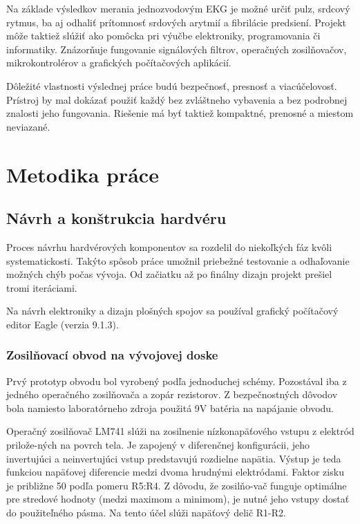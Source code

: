\documentclass[titlepage,12pt]{article}
\begin{document}
Na základe výsledkov merania jednozvodovým EKG je možné určiť pulz, srdcový rytmus, ba aj odhaliť prítomnosť srdových arytmií a fibrilácie predsiení. Projekt môže taktiež slúžiť ako pomôcka pri výučbe elektroniky, programovania či informatiky. Znázorňuje fungovanie signálových filtrov, operačných zosilňovačov, mikrokontrolérov a grafických počítačových aplikácií.

Dôležité vlastnosti výslednej práce budú bezpečnosť, presnosť a viacúčelovosť. Prístroj by mal dokázať použiť každý bez zvláštneho vybavenia a bez podrobnej znalosti jeho fungovania. Riešenie má byť taktiež kompaktné, prenosné a miestom neviazané. 

\newpage
\section{Metodika práce}
\subsection{Návrh a konštrukcia hardvéru}
Proces návrhu hardvérových komponentov sa rozdelil do niekoľkých fáz kvôli \mbox{systematickosti}. Takýto spôsob práce umožnil priebežné testovanie a odhaľovanie možných chýb počas vývoja. Od začiatku až po finálny dizajn projekt prešiel tromi iteráciami. 

Na návrh elektroniky a dizajn plošných spojov sa používal grafický počítačový editor \linebreak Eagle (verzia 9.1.3).

\subsubsection{Zosilňovací obvod na vývojovej doske}
Prvý prototyp obvodu bol vyrobený podľa jednoduchej schémy. Pozostával iba z jedného operačného zosilňovača a zopár rezistorov. Z bezpečnostných dôvodov bola namiesto laboratórneho zdroja použitá 9V batéria na napájanie obvodu. 

Operačný zosilňovač LM741 slúži na zosilnenie nízkonapäťového vstupu z elektród prilože-ných na povrch tela. Je zapojený v diferenčnej konfigurácii, jeho invertujúci a neinvertujúci vstup predstavujú rozdielne napätia. Výstup je teda funkciou napäťovej diferencie medzi dvoma hrudnými elektródami. Faktor zisku je približne 50 podľa pomeru R5:R4. Z dôvodu, že zosilňo-vač funguje optimálne pre stredové hodnoty (medzi maximom a minimom), je nutné jeho vstupy dostať do použiteľného pásma. Na tento účel slúži napäťový delič R1-R2.
\end{document}

